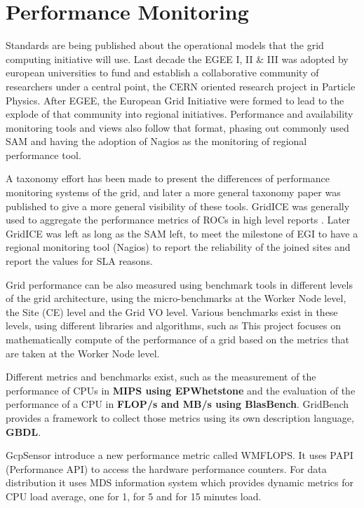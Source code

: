 \section{Performance Monitoring}
Standards are being published about the operational models that the grid computing initiative will use. Last decade the EGEE I, II \& III was adopted by european universities to fund and establish a collaborative community of researchers under a central point, the CERN oriented research project in Particle Physics. After EGEE, the European Grid Initiative were formed to lead to the explode of that community into regional initiatives. Performance and availability monitoring tools and views also follow that format, phasing out commonly used SAM \cite{egee3dsa122} and having the adoption of Nagios as the monitoring of regional performance tool.

A taxonomy effort has been made \cite{gerndt2004performance} to present the differences of performance monitoring systems of the grid, and later a more general \cite{zanikolas2007importance} taxonomy paper was published to give a more general visibility of these tools. GridICE was generally used to aggregate the performance metrics of ROCs in high level reports \cite{andreozzi2005gridice}. Later GridICE was left as long as the SAM left, to meet the milestone of EGI to have a regional monitoring tool (Nagios) to report the reliability of the joined sites and report the values for SLA reasons.

Grid performance can be also measured using benchmark tools in different levels of the grid architecture, using the micro-benchmarks at the Worker Node level, the Site (CE) level and the Grid VO level. Various benchmarks exist in these levels, using different libraries and algorithms, such as This project focuses on mathematically compute of the performance of a grid based on the metrics that are taken at the Worker Node level.

Different metrics and benchmarks exist, such as the measurement of the performance of CPUs in {\bf MIPS using EPWhetstone} and the evaluation of the performance of a CPU in {\bf FLOP/s and MB/s using BlasBench}. GridBench \cite{gridbench} provides a framework to collect those metrics using its own description language, {\bf GBDL}.

GcpSensor \cite{gcpsensor} introduce a new performance metric called WMFLOPS. It uses PAPI \cite{papi} (Performance API) to access the hardware performance counters. For data distribution it uses MDS information system which provides dynamic metrics for CPU load average, one for 1, for 5 and for 15 minutes load.

